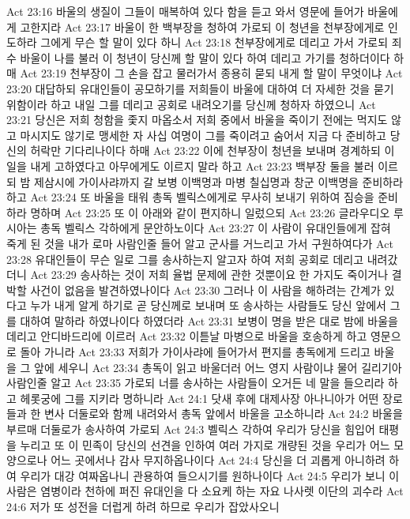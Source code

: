 Act 23:16  바울의 생질이 그들이 매복하여 있다 함을 듣고 와서 영문에 들어가 바울에게 고한지라
Act 23:17  바울이 한 백부장을 청하여 가로되 이 청년을 천부장에게로 인도하라 그에게 무슨 할 말이 있다 하니
Act 23:18  천부장에게로 데리고 가서 가로되 죄수 바울이 나를 불러 이 청년이 당신께 할 말이 있다 하여 데리고 가기를 청하더이다 하매
Act 23:19  천부장이 그 손을 잡고 물러가서 종용히 묻되 내게 할 말이 무엇이냐
Act 23:20  대답하되 유대인들이 공모하기를 저희들이 바울에 대하여 더 자세한 것을 묻기 위함이라 하고 내일 그를 데리고 공회로 내려오기를 당신께 청하자 하였으니
Act 23:21  당신은 저희 청함을 좇지 마옵소서 저희 중에서 바울을 죽이기 전에는 먹지도 않고 마시지도 않기로 맹세한 자 사십 여명이 그를 죽이려고 숨어서 지금 다 준비하고 당신의 허락만 기다리나이다 하매
Act 23:22  이에 천부장이 청년을 보내며 경계하되 이 일을 내게 고하였다고 아무에게도 이르지 말라 하고
Act 23:23  백부장 둘을 불러 이르되 밤 제삼시에 가이사랴까지 갈 보병 이백명과 마병 칠십명과 창군 이백명을 준비하라 하고
Act 23:24  또 바울을 태워 총독 벨릭스에게로 무사히 보내기 위하여 짐승을 준비하라 명하며
Act 23:25  또 이 아래와 같이 편지하니 일렀으되
Act 23:26  글라우디오 루시아는 총독 벨릭스 각하에게 문안하노이다
Act 23:27  이 사람이 유대인들에게 잡혀 죽게 된 것을 내가 로마 사람인줄 들어 알고 군사를 거느리고 가서 구원하여다가
Act 23:28  유대인들이 무슨 일로 그를 송사하는지 알고자 하여 저희 공회로 데리고 내려갔더니
Act 23:29  송사하는 것이 저희 율법 문제에 관한 것뿐이요 한 가지도 죽이거나 결박할 사건이 없음을 발견하였나이다
Act 23:30  그러나 이 사람을 해하려는 간계가 있다고 누가 내게 알게 하기로 곧 당신께로 보내며 또 송사하는 사람들도 당신 앞에서 그를 대하여 말하라 하였나이다 하였더라
Act 23:31  보병이 명을 받은 대로 밤에 바울을 데리고 안디바드리에 이르러
Act 23:32  이튿날 마병으로 바울을 호송하게 하고 영문으로 돌아 가니라
Act 23:33  저희가 가이사랴에 들어가서 편지를 총독에게 드리고 바울을 그 앞에 세우니
Act 23:34  총독이 읽고 바울더러 어느 영지 사람이냐 물어 길리기아 사람인줄 알고
Act 23:35  가로되 너를 송사하는 사람들이 오거든 네 말을 들으리라 하고 헤롯궁에 그를 지키라 명하니라
Act 24:1  닷새 후에 대제사장 아나니아가 어떤 장로들과 한 변사 더둘로와 함께 내려와서 총독 앞에서 바울을 고소하니라
Act 24:2  바울을 부르매 더둘로가 송사하여 가로되
Act 24:3  벨릭스 각하여 우리가 당신을 힘입어 태평을 누리고 또 이 민족이 당신의 선견을 인하여 여러 가지로 개량된 것을 우리가 어느 모양으로나 어느 곳에서나 감사 무지하옵나이다
Act 24:4  당신을 더 괴롭게 아니하려 하여 우리가 대강 여짜옵나니 관용하여 들으시기를 원하나이다
Act 24:5  우리가 보니 이 사람은 염병이라 천하에 퍼진 유대인을 다 소요케 하는 자요 나사렛 이단의 괴수라
Act 24:6  저가 또 성전을 더럽게 하려 하므로 우리가 잡았사오니
